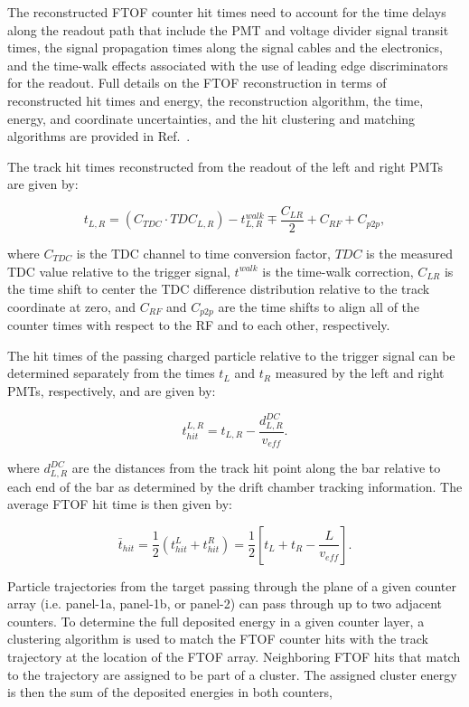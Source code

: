\documentclass{elsart}
\begin{document}
The reconstructed FTOF counter hit times need to account for the time delays along the readout
path that include the PMT and voltage divider signal transit times, the signal propagation times along
the signal cables and the electronics, and the time-walk effects associated with the use of leading edge
discriminators for the readout. Full details on the FTOF reconstruction in terms of reconstructed hit
times and energy, the reconstruction algorithm, the time, energy, and coordinate uncertainties, and
the hit clustering and matching algorithms are provided in Ref.~\cite{ftof-recon}.

The track hit times reconstructed from the readout of the left and right PMTs are given by:

\begin{equation}
t_{L,R} = (C_{TDC} \cdot TDC_{L,R}) - t_{L,R}^{walk} \mp \frac{C_{LR}}{2} + C_{RF} + C_{p2p},
\end{equation}

\noindent
where $C_{TDC}$ is the TDC channel to time conversion factor, $TDC$ is the measured TDC value relative
to the trigger signal, $t^{walk}$ is the time-walk correction, $C_{LR}$ is the time shift to center the TDC
difference distribution relative to the track coordinate at zero, and $C_{RF}$ and $C_{p2p}$ are the time
shifts to align all of the counter times with respect to the RF and to each other, respectively.

The hit times of the passing charged particle relative to the trigger signal can be determined separately 
from the times $t_L$ and $t_R$ measured by the left and right PMTs, respectively, and are given by:

\begin{equation}
t_{hit}^{L,R} = t_{L,R} - \frac{d^{DC}_{L,R}}{v_{eff}}.
\end{equation}

\noindent
where $d^{DC}_{L,R}$ are the distances from the track hit point along the bar relative to each end of the
bar as determined by the drift chamber tracking information. The average FTOF hit time is then given by:

\begin{equation}
\bar{t}_{hit} = \frac{1}{2} ( t_{hit}^L + t_{hit}^R ) = \frac{1}{2} \left[ t_L + t_R - \frac{L}{v_{eff}} \right].
\end{equation}

Particle trajectories from the target passing through the plane of a given counter array (i.e. panel-1a,
panel-1b, or panel-2) can pass through up to two adjacent counters. To determine the full deposited
energy in a given counter layer, a clustering algorithm is used to match the FTOF counter hits with
the track trajectory at the location of the FTOF array. Neighboring FTOF hits that match to the
trajectory are assigned to be part of a cluster. The assigned cluster energy is then the sum of the
deposited energies in both counters,
\end{document}
